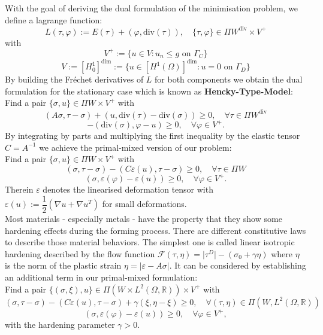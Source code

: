 \documentclass{article}
\begin{document}
With the goal of deriving the dual formulation of the minimisation
problem, we define a lagrange function:
$$L(\tau,\varphi) := E(\tau) + (\varphi, \textrm{div}(\tau)),\quad \lbrace\tau,\varphi\rbrace\in\Pi W^{\textrm{div}}\times V^+$$
with
$$V^+ := \lbrace u\in V: u_n\leq g \text{ on } \Gamma_C \rbrace$$
$$V:=\left[ H_0^1 \right]^{\textrm{dim}}:=\lbrace u\in \left[H^1(\Omega)\right]^{\textrm{dim}}: u
= 0 \text{ on } \Gamma_D\rbrace$$
By building the Fr\'echet derivatives of $L$ for both components we obtain the
dual formulation for the stationary case which is known as \textbf{Hencky-Type-Model}:\\
Find a pair $\lbrace\sigma,u\rbrace\in \Pi W\times V^+$ with
$$\left(A\sigma,\tau - \sigma\right) + \left(u, \textrm{div}(\tau) - \textrm{div}(\sigma)\right) \geq 0,\quad \forall \tau\in \Pi W^{\textrm{div}}$$
$$-\left(\textrm{div}(\sigma),\varphi - u\right) \geq 0,\quad \forall \varphi\in V^+.$$
By integrating by parts and multiplying the first inequality by the elastic
tensor $C=A^{-1}$ we achieve the primal-mixed version of our problem:\\
Find a pair $\lbrace\sigma,u\rbrace\in \Pi W\times V^+$ with
$$\left(\sigma,\tau - \sigma\right) - \left(C\varepsilon(u), \tau - \sigma\right) \geq 0,\quad \forall \tau\in \Pi W$$
$$\left(\sigma,\varepsilon(\varphi) - \varepsilon(u)\right) \geq 0,\quad \forall \varphi\in V^+.$$
Therein $\varepsilon$ denotes the linearised deformation tensor with $\varepsilon(u) := \dfrac{1}{2}\left(\nabla u + \nabla u^T\right)$ for small deformations.\\
Most materials - especially metals - have the property that they show some hardening effects during the forming process.
There are different constitutive laws to describe those material behaviors. The
simplest one is called linear isotropic hardening described by the flow function
$\mathcal{F}(\tau,\eta) = \vert\tau^D\vert - (\sigma_0 + \gamma\eta)$ where
$\eta$ is the norm of the plastic strain $\eta = \vert \varepsilon -
A\sigma\vert$.
It can be considered by establishing an additional term in our primal-mixed formulation:\\
Find a pair $\lbrace(\sigma,\xi),u\rbrace\in \Pi (W\times L^2(\Omega,\mathbb{R}))\times V^+$ with
$$\left(\sigma,\tau - \sigma\right) - \left(C\varepsilon(u), \tau - \sigma\right) + \gamma\left( \xi, \eta - \xi\right) \geq 0,\quad \forall (\tau,\eta)\in \Pi (W,L^2(\Omega,\mathbb{R}))$$
$$\left(\sigma,\varepsilon(\varphi) - \varepsilon(u)\right) \geq 0,\quad \forall \varphi\in V^+,$$
with the hardening parameter $\gamma > 0$.\\
\end{document}
